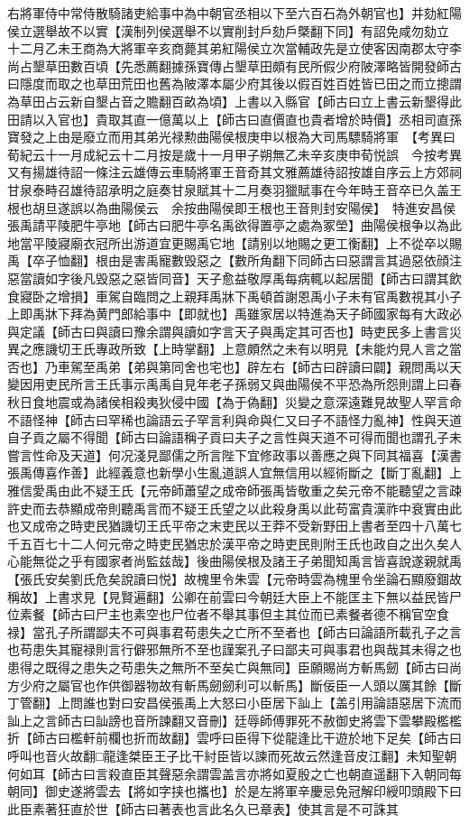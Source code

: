 右將軍侍中常侍散騎諸吏給事中為中朝官丞相以下至六百石為外朝官也】并劾紅陽侯立選舉故不以實【漢制列侯選舉不以實削封戶劾戶槩翻下同】有詔免咸勿劾立　十二月乙未王商為大將軍辛亥商薨其弟紅陽侯立次當輔政先是立使客因南郡太守李尚占墾草田數百頃【先悉薦翻據孫寶傳占墾草田頗有民所假少府陂澤略皆開發師古曰隱度而取之也草田荒田也舊為陂澤本屬少府其後以假百姓百姓皆已田之而立摠謂為草田占云新自墾占音之贍翻百畝為頃】上書以入縣官【師古曰立上書云新墾得此田請以入官也】貴取其直一億萬以上【師古曰直價直也貴者增於時價】丞相司直孫寶發之上由是廢立而用其弟光禄勲曲陽侯根庚申以根為大司馬驃騎將軍　【考異曰荀紀云十一月成紀云十二月按是歲十一月甲子朔無乙未辛亥庚申荀悦誤　今按考異又有揚雄待詔一條注云雄傳云車騎將軍王音奇其文雅薦雄待詔按雄自序云上方郊祠甘泉泰畤召雄待詔承明之庭奏甘泉賦其十二月奏羽獵賦事在今年時王音卒已久盖王根也胡旦遂誤以為曲陽侯云　余按曲陽侯即王根也王音則封安陽侯】　特進安昌侯張禹請平陵肥牛亭地【師古曰肥牛亭名禹欲得置亭之處為冢塋】曲陽侯根争以為此地當平陵寢廟衣冠所出游道宜更賜禹它地【請别以地賜之更工衡翻】上不從卒以賜禹【卒子恤翻】根由是害禹寵數毁惡之【數所角翻下同師古曰惡謂言其過惡依顔注惡當讀如字後凡毁惡之惡皆同音】天子愈益敬厚禹每病輒以起居聞【師古曰謂其飲食寢卧之增損】車駕自臨問之上親拜禹牀下禹頓首謝恩禹小子未有官禹數視其小子上即禹牀下拜為黄門郎給事中【即就也】禹雖家居以特進為天子師國家每有大政必與定議【師古曰與讀曰豫余謂與讀如字言天子與禹定其可否也】時吏民多上書言災異之應譏切王氏專政所致【上時掌翻】上意頗然之未有以明見【未能灼見人言之當否也】乃車駕至禹弟【弟與第同舍也宅也】辟左右【師古曰辟讀曰闢】親問禹以天變因用吏民所言王氏事示禹禹自見年老子孫弱又與曲陽侯不平恐為所怨則謂上曰春秋日食地震或為諸侯相殺夷狄侵中國【為于偽翻】災變之意深遠難見故聖人罕言命不語怪神【師古曰罕稀也論語云子罕言利與命與仁又曰子不語怪力亂神】性與天道自子貢之屬不得聞【師古曰論語稱子貢曰夫子之言性與天道不可得而聞也謂孔子未嘗言性命及天道】何况淺見鄙儒之所言陛下宜修政事以善應之與下同其福喜【漢書張禹傳喜作善】此經義意也新學小生亂道誤人宜無信用以經術斷之【斷丁亂翻】上雅信愛禹由此不疑王氏【元帝師蕭望之成帝師張禹皆敬重之矣元帝不能聽望之言疎許史而去恭顯成帝則聽禹言而不疑王氏望之以此殺身禹以此苟富貴漢祚中衰實由此也又成帝之時吏民猶譏切王氏平帝之末吏民以王莽不受新野田上書者至四十八萬七千五百七十二人何元帝之時吏民猶忠於漢平帝之時吏民則附王氏也政自之出久矣人心能無從之乎有國家者尚監兹哉】後曲陽侯根及諸王子弟聞知禹言皆喜說遂親就禹【張氏安矣劉氏危矣說讀曰悦】故槐里令朱雲【元帝時雲為槐里令坐論石顯廢錮故稱故】上書求見【見賢遍翻】公卿在前雲曰今朝廷大臣上不能匡主下無以益民皆尸位素餐【師古曰尸主也素空也尸位者不舉其事但主其位而已素餐者德不稱官空食禄】當孔子所謂鄙夫不可與事君苟患失之亡所不至者也【師古曰論語所載孔子之言也苟患失其寵禄則言行僻邪無所不至也謹案孔子曰鄙夫可與事君也與哉其未得之也患得之既得之患失之苟患失之無所不至矣亡與無同】臣願賜尚方斬馬劒【師古曰尚方少府之屬官也作供御器物故有斬馬劒劒利可以斬馬】斷佞臣一人頭以厲其餘【斷丁管翻】上問誰也對曰安昌侯張禹上大怒曰小臣居下訕上【盖引用論語惡居下流而訕上之言師古曰訕謗也音所諫翻又音刪】廷辱師傅罪死不赦御史將雲下雲攀殿檻檻折【師古曰檻軒前欄也折而故翻】雲呼曰臣得下從龍逢比干遊於地下足矣【師古曰呼叫也音火故翻□龍逢桀臣王子比干紂臣皆以諫而死故云然逢音皮江翻】未知聖朝何如耳【師古曰言殺直臣其聲惡余謂雲盖言亦將如夏殷之亡也朝直遥翻下入朝同每朝同】御史遂將雲去【將如字挟也攜也】於是左將軍辛慶忌免冠解印綬叩頭殿下曰此臣素著狂直於世【師古曰著表也言此名久已章表】使其言是不可誅其